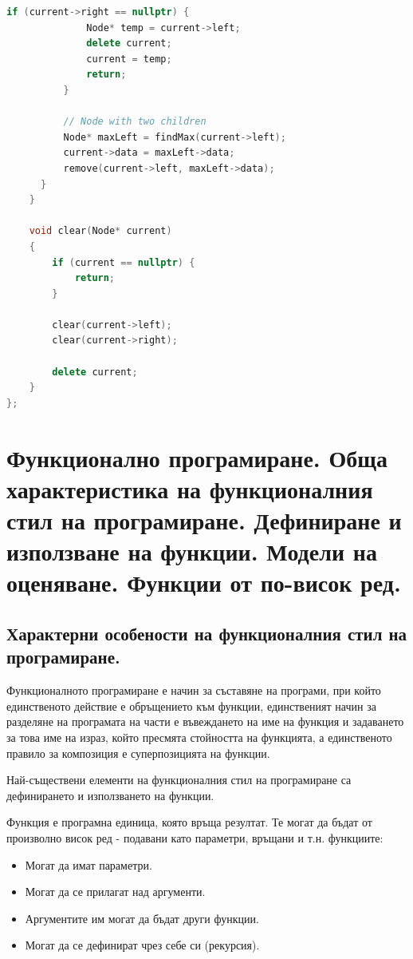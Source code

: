 \documentclass{article}
\renewcommand{\\}{\newline}
\begin{document}
\begin{lstlisting}[language=C++]
          if (current->right == nullptr) {
              Node* temp = current->left;
              delete current;
              current = temp; 
              return;
          }
          
          // Node with two children
          Node* maxLeft = findMax(current->left);
          current->data = maxLeft->data;
          remove(current->left, maxLeft->data);  
      }
    }

    void clear(Node* current)
    {
        if (current == nullptr) {
            return;
        }

        clear(current->left);
        clear(current->right);

        delete current;
    }
};
\end{lstlisting}
\newpage
\section{Функционално програмиране. Обща характеристика на функционалния стил на програмиране. Дефиниране и използване на функции. Модели на оценяване. Функции от по-висок ред.}

\subsection{Характерни особености на функционалния стил на програмиране.}

Функционалното програмиране е начин за съставяне на програми, при който единственото действие е обръщението към функции, единственият начин за разделяне на програмата на части е въвеждането на име на функция и задаването за това име на израз, който пресмята стойността на функцията, а единственото правило за композиция е суперпозицията на функции.

Най-съществени елементи на функционалния стил на програмиране са дефинирането и използването на функции.

Функция е програмна единица, която връща резултат. Те могат да бъдат от произволно висок ред - подавани като параметри, връщани и т.н. функциите:
\begin{itemize}
    \item Могат да имат параметри.
    \item Могат да се прилагат над аргументи.
    \item Аргументите им могат да бъдат други функции.
    \item Могат да се дефинират чрез себе си (рекурсия).
\end{itemize}
\end{document}
